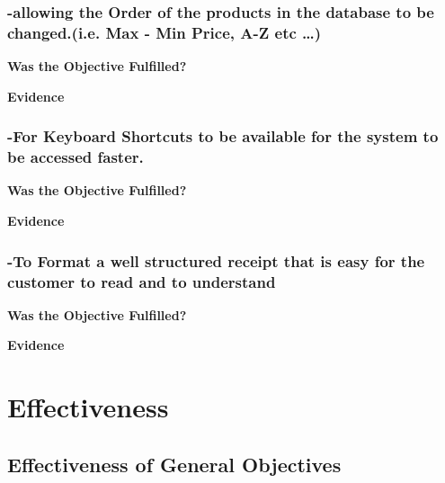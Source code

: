 \subsubsection{-allowing the Order of the products in the database to be changed.(i.e. Max - Min Price, A-Z etc \ldots)}
\textbf{Was the Objective Fulfilled?} \newline

\textbf{Evidence} \newline



\subsubsection{-For Keyboard Shortcuts to be available for the system to be accessed faster.}
\textbf{Was the Objective Fulfilled?} \newline

\textbf{Evidence} \newline



\subsubsection{-To Format a well structured receipt that is easy for the customer to read and to understand}
\textbf{Was the Objective Fulfilled?} \newline

\textbf{Evidence} \newline












\section{Effectiveness}

\subsection{Effectiveness of General Objectives}





















